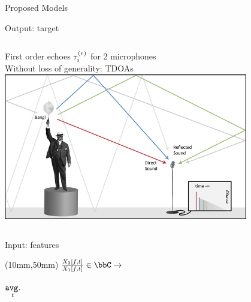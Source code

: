 \begin{frame}{Proposed Models \hfill \faBrain}

    \begin{block}{Output: target}
        \begin{columns}
            First order echoes $\tau_i^{(r)}$ for 2 microphones
            \\Without loss of generality: TDOAs
            \includegraphics[width=0.8\textwidth]{figures/rir_bang.png}
        \end{columns}
    \end{block}

    \begin{block}{Input: features}

    \end{block}

    \begin{center}
    \end{center}

    \begin{textblock*}{40mm}(10mm,50mm)
        $\frac{X_2[f,t]}{X_1[f,t]} \in \bbC \to$ \parbox{10mm}{$\underset{t}{\mathtt{avg.}}$}
    \end{textblock*}

\end{frame}

